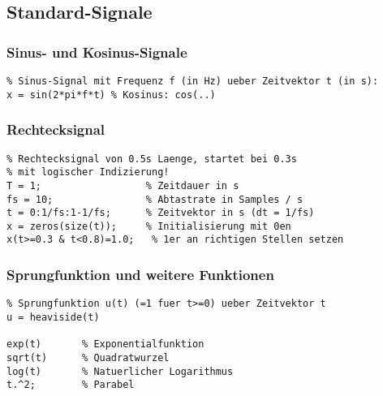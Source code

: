 \documentclass[threecolumn, 5pt, german]{latex4ei/latex4ei_sheet}
\begin{document}
	\begin{sectionbox}
	
		\subsection{Standard-Signale}
		
		\subsubsection{Sinus- und Kosinus-Signale}
		
		\begin{lstlisting}
% Sinus-Signal mit Frequenz f (in Hz) ueber Zeitvektor t (in s):
x = sin(2*pi*f*t) % Kosinus: cos(..)
		\end{lstlisting}
		
		\subsubsection{Rechtecksignal}
		
		\begin{lstlisting}
% Rechtecksignal von 0.5s Laenge, startet bei 0.3s
% mit logischer Indizierung!
T = 1;                  % Zeitdauer in s
fs = 10;                % Abtastrate in Samples / s
t = 0:1/fs:1-1/fs;      % Zeitvektor in s (dt = 1/fs)
x = zeros(size(t));     % Initialisierung mit 0en
x(t>=0.3 & t<0.8)=1.0;   % 1er an richtigen Stellen setzen
		\end{lstlisting}
		
		\subsubsection{Sprungfunktion und weitere Funktionen}
		
		\begin{lstlisting}
% Sprungfunktion u(t) (=1 fuer t>=0) ueber Zeitvektor t
u = heaviside(t)

exp(t)       % Exponentialfunktion
sqrt(t)      % Quadratwurzel
log(t)       % Natuerlicher Logarithmus
t.^2;        % Parabel
		\end{lstlisting}
	\end{sectionbox}
	
	
\end{document}
